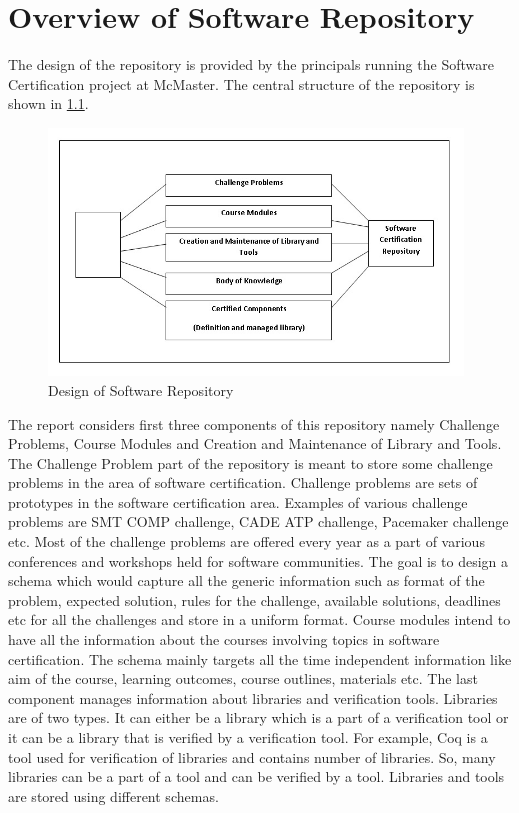 \documentclass[11pt,letterpaper]{report}
\begin{document}
\chapter{Overview of Software Repository}
 The design of the repository is provided by the principals running the Software Certification project at McMaster. The central structure of the repository is shown in \ref{Fig:1}.
\begin{figure}[ht]
\centering
\includegraphics[width=110mm]{Images/Overview_SW_Repo.jpg}
\caption{Design of Software Repository}
\label{Fig:1}
\end{figure}

The report considers first three components of this repository namely Challenge Problems, Course Modules and Creation and Maintenance of Library and Tools. The Challenge Problem part of the repository is meant to store some challenge problems in the area of software certification. Challenge problems are sets of prototypes in the software certification area. Examples of various challenge problems are SMT COMP challenge, CADE ATP challenge, Pacemaker challenge etc. Most of the challenge problems are offered every year as a part of various conferences and workshops held for software communities. The goal is to design a schema which would capture all the generic information such as format of the problem, expected solution, rules for the challenge, available solutions, deadlines etc for all the challenges and store in a uniform format. Course modules intend to have all the information about the courses involving topics in software certification. The schema mainly targets all the time independent information like aim of the course, learning outcomes, course outlines, materials etc. The last component manages information about libraries and verification tools. Libraries are of two types. It can either be a library which is a part of a verification tool or it can be a library that is verified by a verification tool. For example, Coq is a tool used for verification of libraries and contains number of libraries. So, many libraries can be a part of a tool and can be verified by a tool. Libraries and tools are stored using different schemas.  
\end{document}
